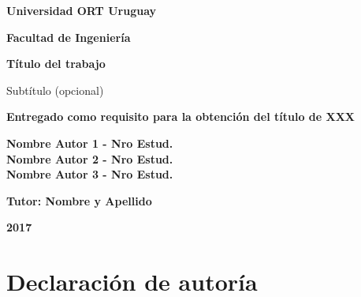 \documentclass[12pt,a4paper,oneside]{book}
\begin{document}
\vspace*{\fill}

\begin{center}

\begin{Large}
\textbf{Universidad ORT Uruguay}

\textbf{Facultad de Ingeniería}
\vspace{5cm}
\end{Large}

\begin{huge}
\textbf{Título del trabajo}
\end{huge} 

\begin{Large}
Subtítulo (opcional)
\end{Large}
\bigskip
\bigskip


\textbf{Entregado como requisito para la obtención del título de XXX}
\vspace{5cm}

\begin{Large}
\textbf{Nombre Autor 1 - Nro Estud.}\\
\textbf{Nombre Autor 2 - Nro Estud.}\\
\textbf{Nombre Autor 3 - Nro Estud.}\\
\bigskip

\textbf{Tutor: Nombre y Apellido}
\vspace{2cm}
\end{Large}

\begin{huge}
\textbf{2017}
\end{huge}

\end{center}
\vspace*{\fill}

\thispagestyle{empty}
\newpage




\chapter*{Declaración de autoría}
\end{document}
